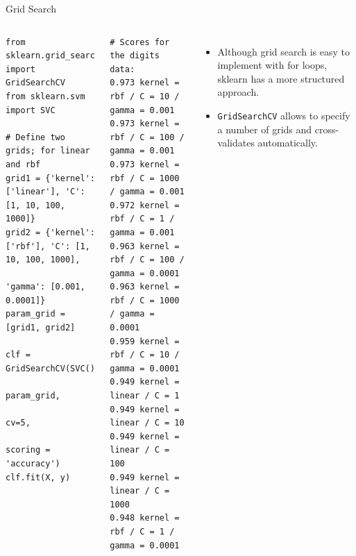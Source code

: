 \documentclass[10pt, aspectratio=169]{beamer} %
\begin{document}
\begin{frame}[fragile]{Grid Search}
\begin{columns}[onlytextwidth]
\begin{lstlisting}
from sklearn.grid_search import GridSearchCV
from sklearn.svm import SVC

# Define two grids; for linear and rbf
grid1 = {'kernel': ['linear'], 'C': [1, 10, 100, 1000]}
grid2 = {'kernel': ['rbf'], 'C': [1, 10, 100, 1000], 
               'gamma': [0.001, 0.0001]}
param_grid = [grid1, grid2]

clf = GridSearchCV(SVC(), 
                   param_grid, 
                   cv=5,
                   scoring = 'accuracy')
clf.fit(X, y)
\end{lstlisting}
\begin{lstlisting}
# Scores for the digits data:
0.973 kernel = rbf / C = 10 / gamma = 0.001 
0.973 kernel = rbf / C = 100 / gamma = 0.001 
0.973 kernel = rbf / C = 1000 / gamma = 0.001 
0.972 kernel = rbf / C = 1 / gamma = 0.001 
0.963 kernel = rbf / C = 100 / gamma = 0.0001 
0.963 kernel = rbf / C = 1000 / gamma = 0.0001 
0.959 kernel = rbf / C = 10 / gamma = 0.0001 
0.949 kernel = linear / C = 1 
0.949 kernel = linear / C = 10 
0.949 kernel = linear / C = 100 
0.949 kernel = linear / C = 1000 
0.948 kernel = rbf / C = 1 / gamma = 0.0001
\end{lstlisting}
\begin{itemize}
\item Although grid search is easy to implement with for loops, sklearn has a more structured approach.
\item \verb+GridSearchCV+ allows to specify a number of grids and cross-validates automatically.
\end{itemize}
\end{columns}
\end{frame}
\end{document}

